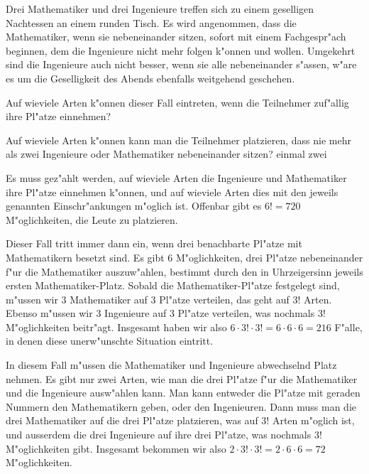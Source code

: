 Drei Mathematiker und drei Ingenieure treffen sich zu einem
geselligen Nachtessen an einem runden Tisch.
Es wird angenommen, dass die Mathematiker, wenn sie nebeneinander
sitzen, sofort mit einem Fachgespr"ach beginnen, dem
die Ingenieure nicht mehr folgen k"onnen und wollen. Umgekehrt
sind die Ingenieure auch nicht besser, wenn sie alle nebeneinander
s"assen, w"are es um die Geselligkeit des Abends ebenfalls weitgehend
geschehen.
\begin{teilaufgaben}
\item
Auf wieviele Arten k"onnen dieser Fall eintreten,
wenn die Teilnehmer zuf"allig ihre Pl"atze einnehmen?
\item
Auf wieviele Arten k"onnen kann man die Teilnehmer platzieren, dass nie
mehr als zwei Ingenieure oder Mathematiker nebeneinander sitzen?
einmal zwei 
\end{teilaufgaben}

\begin{loesung}
Es muss gez"ahlt werden, auf wieviele Arten die Ingenieure und Mathematiker
ihre Pl"atze einnehmen k"onnen, und auf wieviele Arten dies mit den
jeweils genannten Einschr"ankungen m"oglich ist. Offenbar gibt es $6!=720$
M"oglichkeiten, die Leute zu platzieren.
\begin{teilaufgaben}
\item Dieser Fall tritt immer dann ein, wenn drei benachbarte Pl"atze
mit Mathematikern besetzt sind.
Es gibt 6 M"oglichkeiten, drei Pl"atze
nebeneinander f"ur die Mathematiker auszuw"ahlen, bestimmt durch den
in Uhrzeigersinn jeweils ersten Mathematiker-Platz.
Sobald die Mathematiker-Pl"atze festgelegt sind, m"ussen wir 3 Mathematiker
auf 3 Pl"atze verteilen, das geht auf $3!$ Arten. Ebenso m"ussen wir
3 Ingenieure auf 3 Pl"atze verteilen, was nochmals $3!$ M"oglichkeiten
beitr"agt. Insgesamt haben wir also $6\cdot 3!\cdot 3!=6\cdot 6\cdot 6=216$
F"alle, in denen diese unerw"unschte Situation eintritt.
\item In diesem Fall m"ussen die Mathematiker und Ingenieure abwechselnd
Platz nehmen. Es gibt nur zwei Arten, wie man die drei Pl"atze f"ur die
Mathematiker und die Ingenieure ausw"ahlen kann. Man kann entweder die
Pl"atze mit geraden Nummern den Mathematikern geben, oder den Ingenieuren.
Dann muss man die drei Mathematiker auf die drei Pl"atze platzieren,
was auf $3!$ Arten m"oglich ist, und ausserdem die drei Ingenieure auf
ihre drei Pl"atze, was nochmals $3!$ M"oglichkeiten gibt. Insgesamt bekommen
wir also $2\cdot 3!\cdot 3!=2\cdot 6\cdot 6=72$ M"oglichkeiten.
\end{teilaufgaben}
\end{loesung}
